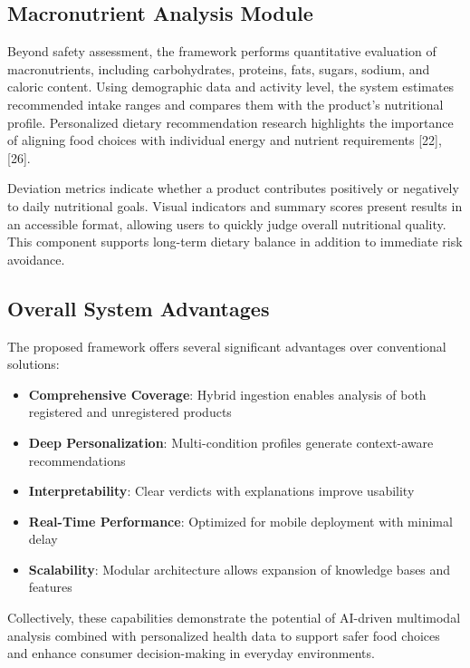 \documentclass[conference]{IEEEtran}
\begin{document}
\subsection{Macronutrient Analysis Module}

Beyond safety assessment, the framework performs quantitative evaluation of macronutrients, including carbohydrates, proteins, fats, sugars, sodium, and caloric content. Using demographic data and activity level, the system estimates recommended intake ranges and compares them with the product’s nutritional profile. Personalized dietary recommendation research highlights the importance of aligning food choices with individual energy and nutrient requirements [22], [26].

Deviation metrics indicate whether a product contributes positively or negatively to daily nutritional goals. Visual indicators and summary scores present results in an accessible format, allowing users to quickly judge overall nutritional quality. This component supports long-term dietary balance in addition to immediate risk avoidance.

\subsection{Overall System Advantages}

The proposed framework offers several significant advantages over conventional solutions:

\begin{itemize}
    \item \textbf{Comprehensive Coverage}: Hybrid ingestion enables analysis of both registered and unregistered products
    \item \textbf{Deep Personalization}: Multi-condition profiles generate context-aware recommendations
    \item \textbf{Interpretability}: Clear verdicts with explanations improve usability
    \item \textbf{Real-Time Performance}: Optimized for mobile deployment with minimal delay
    \item \textbf{Scalability}: Modular architecture allows expansion of knowledge bases and features
\end{itemize}

Collectively, these capabilities demonstrate the potential of AI-driven multimodal analysis combined with personalized health data to support safer food choices and enhance consumer decision-making in everyday environments.
\end{document}
